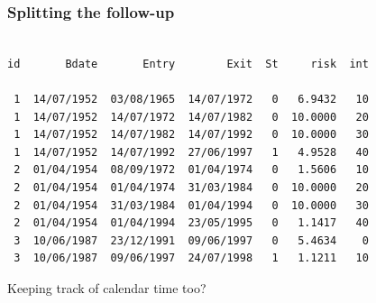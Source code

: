 \begin{frame}[fragile]
  \frametitle{Splitting the follow-up}
{\footnotesize
\renewcommand{\baselinestretch}{0.8}
\begin{verbatim}

id       Bdate       Entry        Exit  St     risk  int

 1  14/07/1952  03/08/1965  14/07/1972   0   6.9432   10
 1  14/07/1952  14/07/1972  14/07/1982   0  10.0000   20
 1  14/07/1952  14/07/1982  14/07/1992   0  10.0000   30
 1  14/07/1952  14/07/1992  27/06/1997   1   4.9528   40
 2  01/04/1954  08/09/1972  01/04/1974   0   1.5606   10
 2  01/04/1954  01/04/1974  31/03/1984   0  10.0000   20
 2  01/04/1954  31/03/1984  01/04/1994   0  10.0000   30
 2  01/04/1954  01/04/1994  23/05/1995   0   1.1417   40
 3  10/06/1987  23/12/1991  09/06/1997   0   5.4634    0
 3  10/06/1987  09/06/1997  24/07/1998   1   1.1211   10
\end{verbatim}
\renewcommand{\baselinestretch}{1.0}
}
 Keeping track of calendar time too?

\end{frame}



